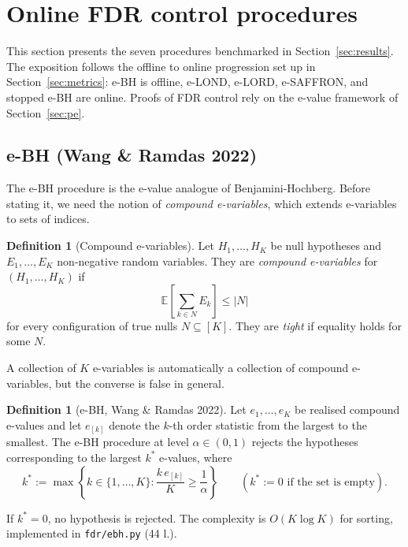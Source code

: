 \documentclass[11pt,a4paper]{article}
\theoremstyle{plain}
\theoremstyle{definition}
\newtheorem{definition}[theorem]{Definition}
\theoremstyle{remark}
\newcommand{\E}{\mathbb{E}}
\begin{document}
\section{Online FDR control procedures}
\label{sec:fdr}

This section presents the seven procedures benchmarked in
Section~\ref{sec:results}. The exposition follows the offline to online
progression set up in Section~\ref{sec:metrics}: e-BH is offline, e-LOND,
e-LORD, e-SAFFRON, and stopped e-BH are online. Proofs of FDR control rely
on the e-value framework of Section~\ref{sec:pe}.

\subsection{e-BH (Wang \& Ramdas 2022)}
\label{sec:ebh}

The e-BH procedure is the e-value analogue of Benjamini-Hochberg. Before
stating it, we need the notion of \emph{compound e-variables}, which extends
e-variables to sets of indices.

\begin{definition}[Compound e-variables]
Let $H_1, \ldots, H_K$ be null hypotheses and $E_1, \ldots, E_K$ non-negative
random variables. They are \emph{compound e-variables} for
$(H_1, \ldots, H_K)$ if
\[
  \E\!\left[\sum_{k \in N} E_k\right] \leq |N|
\]
for every configuration of true nulls $N \subseteq [K]$. They are
\emph{tight} if equality holds for some $N$.
\end{definition}

A collection of $K$ e-variables is automatically a collection of compound
e-variables, but the converse is false in general.

\begin{definition}[e-BH, Wang \& Ramdas 2022]
Let $e_1, \ldots, e_K$ be realised compound e-values and let $e_{[k]}$ denote
the $k$-th order statistic from the largest to the smallest. The e-BH
procedure at level $\alpha \in (0,1)$ rejects the hypotheses corresponding to
the largest $k^*$ e-values, where
\[
  k^* := \max\!\left\{k \in \{1, \ldots, K\} : \frac{k\,e_{[k]}}{K} \geq \frac{1}{\alpha}\right\}
  \qquad (k^* := 0 \text{ if the set is empty}).
\]
\end{definition}

If $k^* = 0$, no hypothesis is rejected. The
complexity is $O(K \log K)$ for sorting, implemented in \texttt{fdr/ebh.py}
(44 l.).
\end{document}
